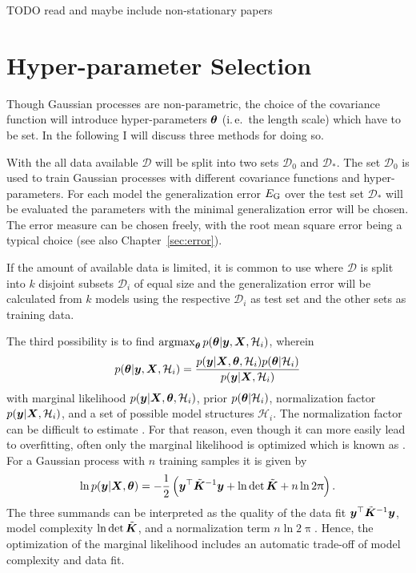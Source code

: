 TODO read and maybe include non-stationary papers

\section{Hyper-parameter Selection}
Though Gaussian processes are non-parametric, the choice of the covariance 
function will introduce hyper-parameters $\bm{\theta}$ (i.\,e.~the length scale) 
which have to be set.  In the following I will discuss three methods for doing 
so.

With the  all data available $\mathcal{D}$ will be 
split into two sets $\mathcal{D}_0$ and $\mathcal{D}_*$. The set $\mathcal{D}_0$ 
is used to train Gaussian processes with different covariance functions and 
hyper-parameters. For each model the generalization error $E_{\mathrm{G}}$ over the 
test set $\mathcal{D}_*$ will be evaluated the parameters with the minimal 
generalization error will be chosen. The error measure can be chosen freely, 
with the root mean square error being a typical choice (see also 
Chapter~\ref{sec:error}).

If the amount of available data is limited, it is common to use 
 where $\mathcal{D}$ is split into $k$ 
disjoint subsets $\mathcal{D}_i$ of equal size and the generalization error will 
be calculated from $k$ models using the respective $\mathcal{D}_i$ as test set 
and the other sets as training data.

The third possibility is to find $\operatorname*{argmax}_{\bm{\theta}} p(\bm{\theta} | \bm{y}, \bm{X}, \mathcal{H}_i)$, wherein
\begin{equation}
    p(\bm{\theta} | \bm{y}, \bm{X}, \mathcal{H}_i) = \frac{p(\bm{y} | \bm{X}, 
        \bm{\theta}, \mathcal{H}_i) p(\bm{\theta} | \mathcal{H}_i)}{p(\bm{y} | \bm{X}, \mathcal{H}_i)}
\end{equation}
with marginal likelihood $p(\bm{y} | \bm{X}, \bm{\theta}, \mathcal{H}_i)$, prior 
$p(\bm{\theta} | \mathcal{H}_i)$, normalization factor $p(\bm{y} | \bm{X}, 
\mathcal{H}_i)$, and a set of possible model structures $\mathcal{H}_i$. The 
normalization factor can be difficult to estimate 
\parencite[109]{Rasmussen:2006vz}. For that reason, even though it can more 
easily lead to overfitting, often only the marginal likelihood is optimized 
which is known as . For a Gaussian 
process with $n$ training samples it is given by
\begin{equation}
    \ln p(\vc y | \mat X, \vc\theta) = -\frac{1}{2}\del{\vc y\Tr 
        \tilde{\mat{K}}^{-1} \vc y + \ln \det \tilde{\mat K} + n \ln 2\uppi} 
    \text{.}
\end{equation}
The three summands can be interpreted as the quality of the data fit $\bm{y}^{\top} 
\tilde{\bm{K}}^{-1} \bm{y}$, model complexity $\ln \det \tilde{\bm{K}}$, and 
a normalization term $n \ln 2\uppi$. Hence, the optimization of the marginal 
likelihood includes an automatic trade-off of model complexity and data fit.

